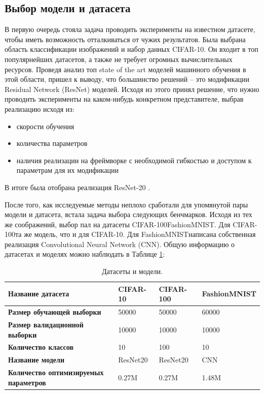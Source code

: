 \documentclass[a4paper,article,14pt]{extarticle}
\begin{document}
\subsection{Выбор модели и датасета}
В первую очередь стояла задача проводить эксперименты на известном датасете, чтобы иметь возможность отталкиваться от чужих результатов. Была выбрана область классификации изображений и набор данных \flqq CIFAR-10\frqq. Он входит в топ популярнейших датасетов, а также не требует огромных вычислительных ресурсов. Проведя анализ топ state of the art моделей машинного обучения в этой области, пришел к выводу, что большинство решений -- это модификации Residual Network (ResNet) моделей. Исходя из этого принял решение, что нужно проводить эксперименты на каком-нибудь конкретном представителе, выбрав реализацию исходя из:
\begin{itemize}
    \item скорости обучения
    \item количества параметров
    \item наличия реализации на фреймворке с необходимой гибкостью и доступом к параметрам для их модификации
\end{itemize}

В итоге была отобрана реализация ResNet-20 \cite{github_resnet}.

После того, как исследуемые методы неплохо сработали для упомянутой пары модели и датасета, встала задача выбора следующих бенчмарков. Исходя из тех же соображений, выбор пал на датасеты \flqq CIFAR-100\frqq{} \flqq FashionMNIST\frqq. Для \flqq CIFAR-100\frqq{} та же модель, что и для \flqq CIFAR-10\frqq. Для \flqq FashionMNIST\frqq{} написана собственная реализация Convolutional Neural Network (CNN). Общую информацию о датасетах и моделях можно наблюдать в Таблице \ref{table:datasets}:


\begin{center}
    \begin{longtable}{|p{5cm}|p{3cm}|p{3cm}|p{3cm}|}
    \caption{Датасеты и модели.}
    \label{table:datasets}\\
    \hline
    \textbf{Название датасета} & CIFAR-10  & CIFAR-100 & FashionMNIST\\
    \hline
    \textbf{Размер обучающей выборки} & 50000 & 50000 & 60000\\
    \hline
    \textbf{Размер валидационной выборки} & 10000 & 10000 & 10000\\
    \hline
    \textbf{Количество классов} & 10 & 100 & 10\\
    \hline
    \textbf{Название модели} & ResNet20 & ResNet20 & CNN\\
    \hline
    \textbf{Количество оптимизируемых параметров} & 0.27M & 0.27M & 1.48M\\
    \hline
    \end{longtable}
\end{center}
\end{document}
